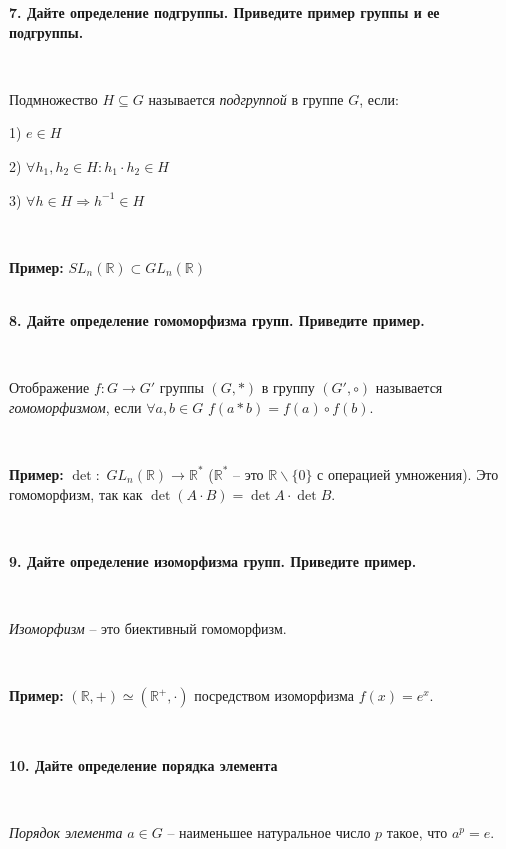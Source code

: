 \documentclass{article}
\begin{document}
    \textbf{7. Дайте определение подгруппы. Приведите пример группы и ее подгруппы.}

    {
        $\;$
        \setlength{\parindent}{0.4cm}
        \hangindent=0.4cm


    Подмножество $H\subseteq G$ называется \textit{подгруппой} в группе $G$, если:

    1) $e\in H$

        2) $\forall h_1, h_2\in H: h_1\cdot h_2\in H$

        3) $\forall h\in H\Rightarrow h^{-1}\in H$

        $\;$

        \textbf{Пример:} $SL_n(\mathbb{R})\subset GL_n(\mathbb{R})$\\

        $\;$
        \setlength{\parindent}{0cm}
        \hangindent=0cm
    }

    \textbf{8. Дайте определение гомоморфизма групп. Приведите пример.}

    {
        $\;$
        \setlength{\parindent}{0.4cm}
        \hangindent=0.4cm


    Отображение $f:G\rightarrow G'$ группы $(G, \ast)$ в группу $(G', \circ)$ называется \textit{гомоморфизмом}, если $\forall a, b\in G$ $f(a\ast b)=f(a)\circ f(b)$.

        $\;$

        \textbf{Пример:} $\det:$ $GL_n(\mathbb{R})\rightarrow\mathbb{R}^{\ast}$ ($\mathbb{R}^{\ast}$ -- это $\mathbb{R}\backslash\{0\}$ с операцией умножения). Это гомоморфизм, так как $\det(A\cdot B)=\det A\cdot \det B$.

        $\;$
        \setlength{\parindent}{0cm}
        \hangindent=0cm
    }

    \textbf{9. Дайте определение изоморфизма групп. Приведите пример.}

    {
        $\;$
        \setlength{\parindent}{0.4cm}
        \hangindent=0.4cm


    \textit{Изоморфизм} -- это биективный гомоморфизм.

        $\;$

        \textbf{Пример:} $(\mathbb{R}, +)\simeq(\mathbb{R}^+, \cdot)$ посредством изоморфизма $f(x)=e^x$.

        $\;$
        \setlength{\parindent}{0cm}
        \hangindent=0cm
    }

    \textbf{10. Дайте определение порядка элемента}

    {
        $\;$
        \setlength{\parindent}{0.4cm}
        \hangindent=0.4cm


    \textit{Порядок элемента} $a\in G$ -- наименьшее натуральное число $p$ такое, что $a^p=e$.

        $\;$
        \setlength{\parindent}{0cm}
        \hangindent=0cm
    }
\end{document}
